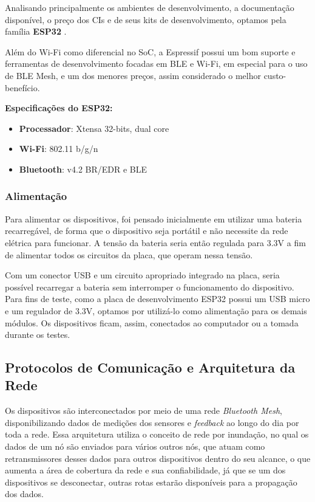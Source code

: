 \documentclass[../monografia.tex]{subfiles}
\begin{document}
Analisando principalmente os ambientes de desenvolvimento, a documentação disponível, o preço dos CIs e de seus kits de desenvolvimento, optamos pela família \textbf{ESP32} \cite{ESP32}. 

Além do Wi-Fi como diferencial no SoC, a Espressif possui um bom suporte e ferramentas de desenvolvimento focadas em BLE e Wi-Fi, em especial para o uso de BLE Mesh, e um dos menores preços, assim considerado o melhor custo-benefício. 

\textbf{Especificações do ESP32:} \cite{ESP-datasheet}
\begin{itemize}
\item \textbf{Processador}: Xtensa 32-bits, dual core
\item \textbf{Wi-Fi}: 802.11 b/g/n
\item \textbf{Bluetooth}: v4.2 BR/EDR e BLE
\end{itemize}



\subsubsection{Alimentação}

Para alimentar os dispositivos, foi pensado inicialmente em utilizar uma bateria recarregável, de forma que o dispositivo seja portátil e não necessite da rede elétrica para funcionar. A tensão da bateria seria então regulada para 3.3V a fim de alimentar todos os circuitos da placa, que operam nessa tensão. 

Com um conector USB e um circuito apropriado integrado na placa, seria possível recarregar a bateria sem interromper o funcionamento do dispositivo. Para fins de teste, como a placa de desenvolvimento ESP32 possui um USB micro e um regulador de 3.3V, optamos por utilizá-lo como alimentação para os demais módulos. Os dispositivos ficam, assim, conectados ao computador ou a tomada durante os testes.

\subsection{Protocolos de Comunicação e Arquitetura da Rede}

Os dispositivos são interconectados por meio de uma rede \textit{Bluetooth Mesh}, disponibilizando dados de medições dos sensores e \textit{feedback} ao longo do dia por toda a rede. Essa arquitetura utiliza o conceito de rede por inundação, no qual os dados de um nó são enviados para vários outros nós, que atuam como retransmissores desses dados para outros dispositivos dentro do seu alcance, o que aumenta a área de cobertura da rede e sua confiabilidade, já que se um dos dispositivos se desconectar, outras rotas estarão disponíveis para a propagação dos dados.
\end{document}
